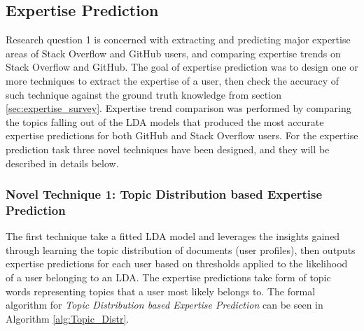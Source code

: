     \subsection{Expertise Prediction\label{RQ1_task}}
        Research question 1 is concerned with extracting and predicting major expertise areas of Stack Overflow and GitHub users, and comparing expertise trends on Stack Overflow and GitHub. The goal of expertise prediction was to design one or more techniques to extract the expertise of a user, then check the accuracy of such technique against the ground truth knowledge from section \ref{sec:expertise_survey}. Expertise trend comparison was performed by comparing the topics falling out of the LDA models that produced the most accurate expertise predictions for both GitHub and Stack Overflow users. For the expertise prediction task three novel techniques have been designed, and they will be described in details below. 
        
        \subsubsection{Novel Technique 1: Topic Distribution based Expertise Prediction}
            The first technique take a fitted LDA model and leverages the insights gained through learning the topic distribution of documents (user profiles), then outputs expertise predictions for each user based on thresholds applied to the likelihood of a user belonging to an LDA. The expertise predictions take form of topic words representing topics that a user most likely belongs to. The formal algorithm for \emph{Topic Distribution based Expertise Prediction} can be seen in Algorithm \ref{alg:Topic_Distr}.
            
